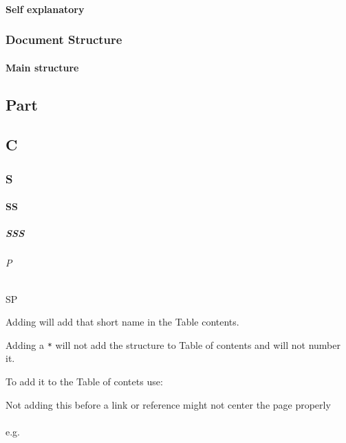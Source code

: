 \documentclass[11pt,a4paper]{report}
\begin{document}
{\subsection{Self explanatory}
\begin{latex}

\tableofcontents

\newpage
\clearpage
\end{latex}

\section{Document Structure}
\subsection{Main structure}
\begin{latex}
\part{Part}
\chapter{C} %
\section{S}
\subsection{SS}
\subsubsection{SSS}
\paragraph{P}
\subparagraph{SP}
\end{latex}

Adding  will add that short name in the Table contents.

Adding a \texttt{*} will not add the structure to Table of contents and will not
number it.

To add it to the Table of contets use:

Not adding this before a link or reference might not center the page properly\\
\\
e.g. 


}
\end{document}
